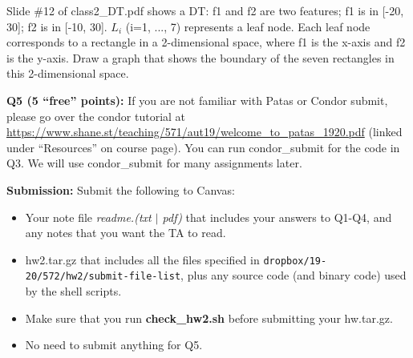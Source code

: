 \documentclass[11pt]{article}
\begin{document}
\vspace{0.7 in}

 Slide \#12 of class2\_DT.pdf 
shows a DT: f1 and f2 are two features; 
f1 is in [-20, 30]; f2 is in [-10, 30].
$L_i$ (i=1, ..., 7) represents a leaf node.
Each leaf node corresponds to a rectangle in 
a 2-dimensional space, where f1 is the x-axis and f2
is the y-axis. Draw a graph that shows the boundary 
of the seven rectangles in this 2-dimensional space.


\vspace{0.7 in}
\noindent
{\bf Q5 (5 ``free'' points):} 
    If you are not familiar with Patas or Condor submit, please 
    go over the condor tutorial at
    \href{https://www.shane.st/teaching/571/aut19/welcome_to_patas_1920.pdf}{https://www.shane.st/teaching/571/aut19/welcome\_to\_patas\_1920.pdf}
    (linked under ``Resources'' on course page).
    You can run condor\_submit for the code in Q3.
    We will use condor\_submit for many assignments later.
    

\vspace{2in}
\hspace{-0.3in}
{\bf Submission:} Submit the following to Canvas:

\begin{itemize}
  \item Your note file {\it readme.(txt $\mid$ pdf)}
      that includes your answers to Q1-Q4, 
      and any notes that you want the TA to read.

    \item hw2.tar.gz that includes all the files specified in
	    {\tt dropbox/19-20/572/hw2/submit-file-list}, plus any source code
      (and binary code) used by the shell scripts.

    \item Make sure that you run {\bf check\_hw2.sh} before
      submitting your hw.tar.gz.

    \item No need to submit anything for Q5.
      
\end{itemize}
\end{document}
